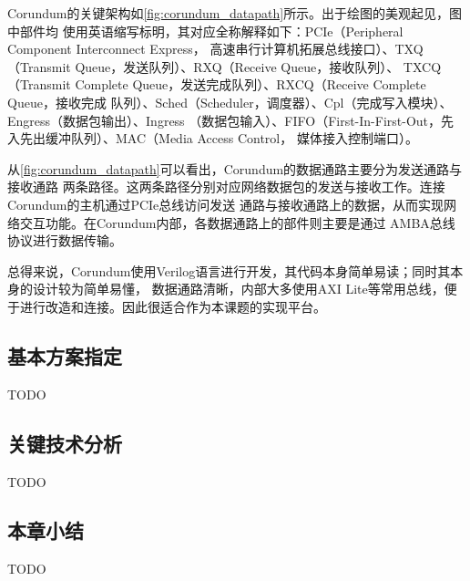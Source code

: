 Corundum的关键架构如\autoref{fig:corundum_datapath}所示。出于绘图的美观起见，图中部件均
使用英语缩写标明，其对应全称解释如下：PCIe（Peripheral Component Interconnect Express，
高速串行计算机拓展总线接口）、TXQ（Transmit Queue，发送队列）、RXQ（Receive Queue，接收队列）、
TXCQ（Transmit Complete Queue，发送完成队列）、RXCQ（Receive Complete Queue，接收完成
队列）、Sched（Scheduler，调度器）、Cpl（完成写入模块）、Engress（数据包输出）、Ingress
（数据包输入）、FIFO（First-In-First-Out，先入先出缓冲队列）、MAC（Media Access Control，
媒体接入控制端口）。


从\autoref{fig:corundum_datapath}可以看出，Corundum的数据通路主要分为发送通路与接收通路
两条路径。这两条路径分别对应网络数据包的发送与接收工作。连接Corundum的主机通过PCIe总线访问发送
通路与接收通路上的数据，从而实现网络交互功能。在Corundum内部，各数据通路上的部件则主要是通过
AMBA总线协议\cite{arm2011axi}进行数据传输。

总得来说，Corundum使用Verilog语言进行开发，其代码本身简单易读；同时其本身的设计较为简单易懂，
数据通路清晰，内部大多使用AXI Lite等常用总线，便于进行改造和连接。因此很适合作为本课题的实现平台。

\subsection{基本方案指定}



TODO

\subsection{关键技术分析}

TODO

\subsection{本章小结}

TODO
